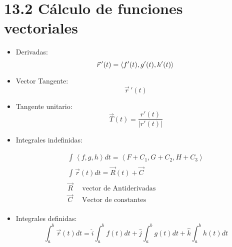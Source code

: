 % 
% 

\section{13.2 Cálculo de funciones vectoriales}
\begin{itemize}
    \item Derivadas:
        \[
            \vec{r}\,'(t)=\left\langle f'(t),g'(t),h'(t) \right\rangle \\ 
        \]
    
    \item Vector Tangente:
        \[
          \vec{r}\, ' (t) 
        \]
    
    \item Tangente unitario:
        \[
          \vec{T}(t)=\frac{r'(t)}{\left| r'(t) \right| } 
        \]
    
    \item Integrales indefinidas:
        \begin{center}
            \begin{align*}
                \int_{}^{}\left\langle f,g,h \right\rangle dt = \left\langle F+C_1,G+C_2,H+C_3 \right\rangle \\
                \int_{}^{}\vec{r}(t) dt  = \vec{R}(t) + \vec{C} \\
                \vec{R} \quad \text{ vector de Antiderivadas  } \\ 
                \vec{C} \quad \text{  Vector de constantes  } \\   
              \end{align*}
        \end{center}
    
    \item Integrales definidas:
        \[
          \int_{a}^{b}\vec{r}(t)dt = \hat{i} \int_{a}^{b}f(t)dt+ \hat{j} \int_{a}^{b}g(t)dt + \hat{k} \int_{a}^{b}h(t)dt
        \]
\end{itemize}


